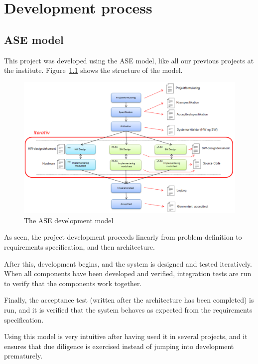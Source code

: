 \chapter{Development process}

\section{ASE model}
This project was developed using the ASE model, like all our previous projects at the institute. Figure~\ref{fig:asemodel} shows the structure of the model.

\begin{figure}[H]
\centering
\includegraphics[width=1\linewidth]{ASE_model}
\caption{The ASE development model}
\label{fig:asemodel}
\end{figure}

 As seen, the project development proceeds linearly from problem definition to requirements specification, and then architecture. 
 
 After this, development begins, and the system is designed and tested iteratively. When all components have been developed and verified, integration tests are run to verify that the components work together.
 
  Finally, the acceptance test (written after the architecture has been completed) is run, and it is verified that the system behaves as expected from the requirements specification.
  
  Using this model is very intuitive after having used it in several projects, and it ensures that due diligence is exercised instead of jumping into development prematurely.
  
